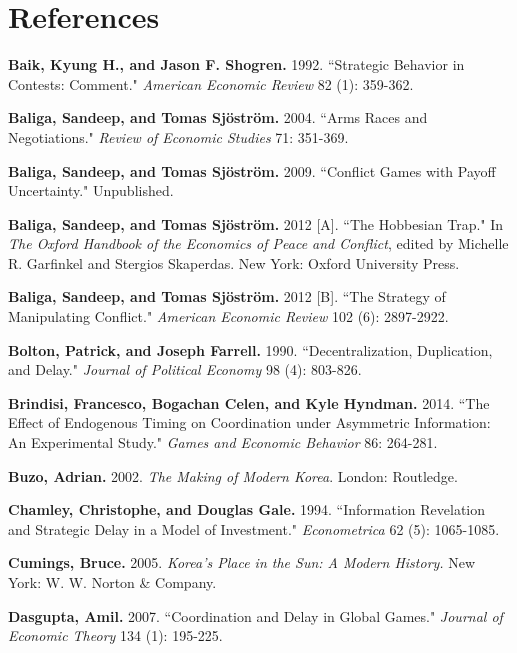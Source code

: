 \documentclass[12pt,english]{article}
\begin{document}
\newpage
\section*{References}
\singlespacing 

\noindent
\hangindent 12pt
\textbf{Baik, Kyung H., and Jason F. Shogren.} 1992. ``Strategic Behavior in Contests: Comment." \textit{American Economic Review} 82 (1): 359-362.

\noindent
\hangindent 12pt
\textbf{Baliga, Sandeep, and Tomas Sj\"ostr\"om.} 2004. ``Arms Races and Negotiations." \textit{Review of Economic Studies} 71: 351-369.

\noindent
\hangindent 12pt
\textbf{Baliga, Sandeep, and Tomas Sj\"ostr\"om.} 2009. ``Conflict Games with Payoff Uncertainty." Unpublished.

\noindent
\hangindent 12pt
\textbf{Baliga, Sandeep, and Tomas Sj\"ostr\"om.} 2012 [A]. ``The Hobbesian Trap." In \textit{The Oxford Handbook of the Economics of Peace and Conflict}, edited by Michelle R. Garfinkel and Stergios Skaperdas. New York: Oxford University Press.

\noindent
\hangindent 12pt
    \textbf{Baliga, Sandeep, and Tomas Sj\"ostr\"om.} 2012 [B]. ``The Strategy of Manipulating Conflict." \textit{American Economic Review} 102 (6): 2897-2922.

\noindent
\hangindent 12pt
\textbf{Bolton, Patrick, and Joseph Farrell.} 1990. ``Decentralization, Duplication, and Delay." \textit{Journal of Political Economy} 98 (4): 803-826.

\noindent
\hangindent 12pt
\textbf{Brindisi, Francesco, Bogachan Celen, and Kyle Hyndman.} 2014. ``The Effect of Endogenous Timing on Coordination under Asymmetric Information: An Experimental Study." \textit{Games and Economic Behavior} 86: 264-281.

\noindent
\hangindent 12pt
\textbf{Buzo, Adrian.} 2002. \textit{The Making of Modern Korea}. London: Routledge.

\noindent
\hangindent 12pt
\textbf{Chamley, Christophe, and Douglas Gale.} 1994. ``Information Revelation and Strategic Delay in a Model of Investment." \textit{Econometrica} 62 (5): 1065-1085.

\noindent
\hangindent 12pt
\textbf{Cumings, Bruce.} 2005. \textit{Korea's Place in the Sun: A Modern History.} New York: W. W. Norton \& Company.

\noindent
\hangindent 12pt
\textbf{Dasgupta, Amil.} 2007. ``Coordination and Delay in Global Games." \textit{Journal of Economic Theory} 134 (1): 195-225.
\end{document}
